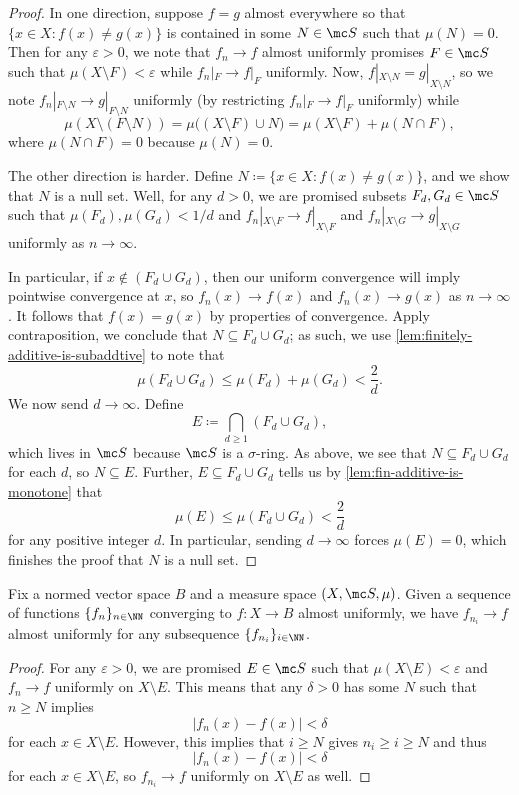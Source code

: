 \documentclass[../notes.tex]{subfiles}
\begin{document}
\begin{proof}
	In one direction, suppose $f=g$ almost everywhere so that $\{x\in X:f(x)\ne g(x)\}$ is contained in some $N\in\mc S$ such that $\mu(N)=0$. Then for any $\varepsilon>0$, we note that $f_n\to f$ almost uniformly promises $F\in\mc S$ such that $\mu(X\setminus F)<\varepsilon$ while $f_n|_F\to f|_F$ uniformly. Now, $f|_{X\setminus N}=g|_{X\setminus N}$, so we note $f_n|_{F\setminus N}\to g|_{F\setminus N}$ uniformly (by restricting $f_n|_F\to f|_F$ uniformly) while
	\[\mu(X\setminus(F\setminus N))=\mu\big((X\setminus F)\cup N\big)=\mu(X\setminus F)+\mu(N\cap F),\]
	where $\mu(N\cap F)=0$ because $\mu(N)=0$.

	The other direction is harder. Define $N\coloneqq\{x\in X:f(x)\ne g(x)\}$, and we show that $N$ is a null set. Well, for any $d>0$, we are promised subsets $F_d,G_d\in\mc S$ such that $\mu(F_d),\mu(G_d)<1/d$ and $f_n|_{X\setminus F}\to f|_{X\setminus F}$ and $f_n|_{X\setminus G}\to g|_{X\setminus G}$ uniformly as $n\to\infty$.

	In particular, if $x\notin(F_d\cup G_d)$, then our uniform convergence will imply pointwise convergence at $x$, so $f_n(x)\to f(x)$ and $f_n(x)\to g(x)$ as $n\to\infty$. It follows that $f(x)=g(x)$ by properties of convergence. Apply contraposition, we conclude that $N\subseteq F_d\cup G_d$; as such, we use \autoref{lem:finitely-additive-is-subaddtive} to note that
	\[\mu(F_d\cup G_d)\le\mu(F_d)+\mu(G_d)<\frac2d.\]
	We now send $d\to\infty$. Define
	\[E\coloneqq\bigcap_{d\ge1}(F_d\cup G_d),\]
	which lives in $\mc S$ because $\mc S$ is a $\sigma$-ring. As above, we see that $N\subseteq F_d\cup G_d$ for each $d$, so $N\subseteq E$. Further, $E\subseteq F_d\cup G_d$ tells us by \autoref{lem:fin-additive-is-monotone} that
	\[\mu(E)\le\mu(F_d\cup G_d)<\frac2d\]
	for any positive integer $d$. In particular, sending $d\to\infty$ forces $\mu(E)=0$, which finishes the proof that $N$ is a null set.
\end{proof}
\begin{lemma} \label{lem:almost-uniformly-subsequence}
	Fix a normed vector space $B$ and a measure space $(X,\mc S,\mu)$. Given a sequence of functions $\{f_n\}_{n\in\NN}$ converging to $f\colon X\to B$ almost uniformly, we have $f_{n_i}\to f$ almost uniformly for any subsequence $\{f_{n_i}\}_{i\in\NN}$.
\end{lemma}
\begin{proof}
	For any $\varepsilon>0$, we are promised $E\in\mc S$ such that $\mu(X\setminus E)<\varepsilon$ and $f_n\to f$ uniformly on $X\setminus E$. This means that any $\delta>0$ has some $N$ such that $n\ge N$ implies
	\[|f_n(x)-f(x)|<\delta\]
	for each $x\in X\setminus E$. However, this implies that $i\ge N$ gives $n_i\ge i\ge N$ and thus
	\[|f_n(x)-f(x)|<\delta\]
	for each $x\in X\setminus E$, so $f_{n_i}\to f$ uniformly on $X\setminus E$ as well.
\end{proof}
\end{document}
